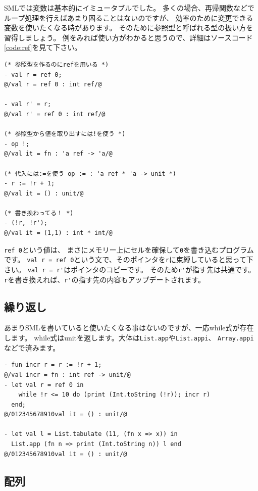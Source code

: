 \documentclass[11pt,a4paper]{article}
\begin{document}
SMLでは変数は基本的にイミュータブルでした。
多くの場合、再帰関数などでループ処理を行えばあまり困ることはないのですが、
効率のために変更できる変数を使いたくなる時があります。
そのために参照型と呼ばれる型の扱い方を習得しましょう。
例をみれば使い方がわかると思うので、詳細はソースコード\ref{code:ref}を見て下さい。

\begin{lstlisting}[caption=ref型,label=code:ref]
(* 参照型を作るのにrefを用いる *)
- val r = ref 0;
@/val r = ref 0 : int ref/@

- val r' = r;
@/val r' = ref 0 : int ref/@

(* 参照型から値を取り出すには!を使う *)
- op !;
@/val it = fn : 'a ref -> 'a/@

(* 代入には:=を使う op := : 'a ref * 'a -> unit *)
- r := !r + 1;
@/val it = () : unit/@

(* 書き換わってる！ *)
- (!r, !r');
@/val it = (1,1) : int * int/@
\end{lstlisting}

\lstinline{ref 0}という値は、
まさにメモリー上にセルを確保して\lstinline{0}を書き込むプログラムです。
\lstinline{val r = ref 0}という文で、そのポインタを\lstinline{r}に束縛していると思って下さい。
\lstinline{val r = r'}はポインタのコピーです。
そのため\lstinline{r'}が指す先は共通です。
\lstinline{r}を書き換えれば、\lstinline{r'}の指す先の内容もアップデートされます。

\subsection{繰り返し}

あまりSMLを書いていると使いたくなる事はないのですが、一応while式が存在します。
while式はunitを返します。大体は\lstinline{List.app}や\lstinline{List.appi}、
\lstinline{Array.appi}などで済みます。

\begin{lstlisting}[caption=while式,label=code:while]
- fun incr r = r := !r + 1;
@/val incr = fn : int ref -> unit/@
- let val r = ref 0 in
    while !r <= 10 do (print (Int.toString (!r)); incr r)
  end;
@/012345678910val it = () : unit/@

- let val l = List.tabulate (11, (fn x => x)) in
  List.app (fn n => print (Int.toString n)) l end
@/012345678910val it = () : unit/@
\end{lstlisting}

\subsection{配列}
\end{document}
